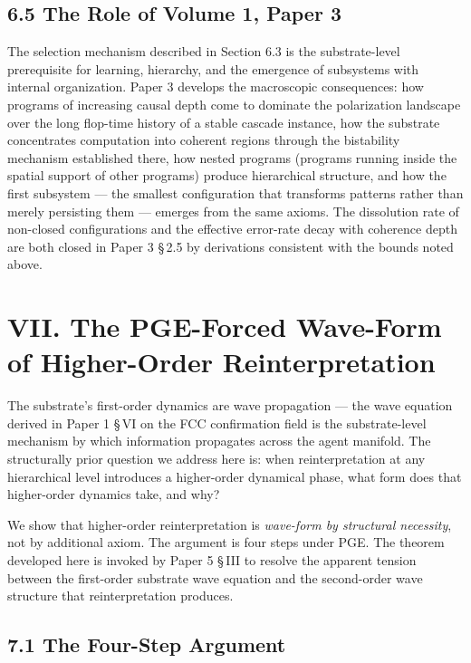 \documentclass[11pt,oneside]{report}
\theoremstyle{definition}
\theoremstyle{remark}
\begin{document}
\subsection*{6.5 The Role of Volume 1, Paper 3}

The selection mechanism described in Section 6.3 is the substrate-level
prerequisite for learning, hierarchy, and the emergence of subsystems
with internal organization. Paper 3 develops the macroscopic
consequences: how programs of increasing causal depth come to dominate
the polarization landscape over the long flop-time history of a stable
cascade instance, how the substrate concentrates computation into
coherent regions through the bistability mechanism established there,
how nested programs (programs running inside the spatial support of
other programs) produce hierarchical structure, and how the first
subsystem --- the smallest configuration that transforms patterns rather
than merely persisting them --- emerges from the same axioms. The
dissolution rate of non-closed configurations and the effective
error-rate decay with coherence depth are both closed in Paper 3 \S\,2.5 by
derivations consistent with the bounds noted above.

\section*{VII. The PGE-Forced Wave-Form of Higher-Order Reinterpretation}

The substrate's first-order dynamics are wave propagation --- the wave
equation derived in Paper 1 \S\,VI on the FCC confirmation field is the
substrate-level mechanism by which information propagates across the
agent manifold. The structurally prior question we address here is: when
reinterpretation at any hierarchical level introduces a higher-order
dynamical phase, what form does that higher-order dynamics take, and
why?

We show that higher-order reinterpretation is \emph{wave-form by
structural necessity}, not by additional axiom. The argument is four
steps under PGE. The theorem developed here is invoked by Paper 5 \S\,III
to resolve the apparent tension between the first-order substrate wave
equation and the second-order wave structure that reinterpretation
produces.

\subsection*{7.1 The Four-Step Argument}
\end{document}
